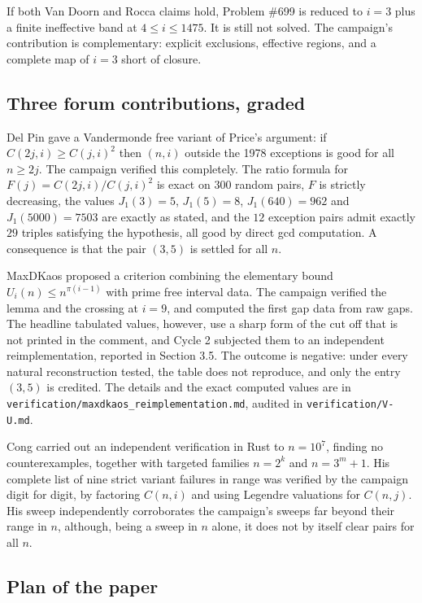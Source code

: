 \documentclass[11pt]{article}
\theoremstyle{remark}
\begin{document}
If both Van Doorn and Rocca claims hold, Problem \#699 is reduced to $i=3$ plus a finite ineffective band at $4\le i\le 1475$. It is still not solved. The campaign's contribution is complementary: explicit exclusions, effective regions, and a complete map of $i=3$ short of closure.

\subsection{Three forum contributions, graded}

Del Pin gave a Vandermonde free variant of Price's argument: if $C(2j,i)\ge C(j,i)^2$ then $(n,i)$ outside the 1978 exceptions is good for all $n\ge 2j$. The campaign verified this completely. The ratio formula for $F(j)=C(2j,i)/C(j,i)^2$ is exact on $300$ random pairs, $F$ is strictly decreasing, the values $J_1(3)=5$, $J_1(5)=8$, $J_1(640)=962$ and $J_1(5000)=7503$ are exactly as stated, and the $12$ exception pairs admit exactly $29$ triples satisfying the hypothesis, all good by direct gcd computation. A consequence is that the pair $(3,5)$ is settled for all $n$.

MaxDKaos proposed a criterion combining the elementary bound $U_i(n)\le n^{\pi(i-1)}$ with prime free interval data. The campaign verified the lemma and the crossing at $i=9$, and computed the first gap data from raw gaps. The headline tabulated values, however, use a sharp form of the cut off that is not printed in the comment, and Cycle 2 subjected them to an independent reimplementation, reported in Section 3.5. The outcome is negative: under every natural reconstruction tested, the table does not reproduce, and only the entry $(3,5)$ is credited. The details and the exact computed values are in \texttt{verification/maxdkaos\_reimplementation.md}, audited in \texttt{verification/V-U.md}.

Cong carried out an independent verification in Rust to $n=10^7$, finding no counterexamples, together with targeted families $n=2^k$ and $n=3^m+1$. His complete list of nine strict variant failures in range was verified by the campaign digit for digit, by factoring $C(n,i)$ and using Legendre valuations for $C(n,j)$. His sweep independently corroborates the campaign's sweeps far beyond their range in $n$, although, being a sweep in $n$ alone, it does not by itself clear pairs for all $n$.

\subsection{Plan of the paper}
\end{document}

